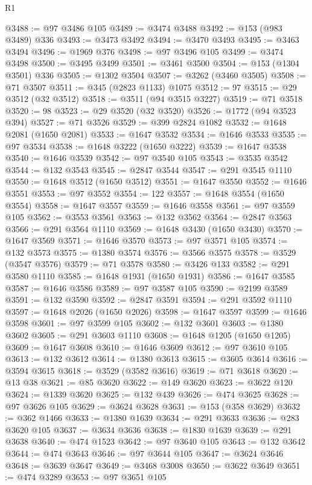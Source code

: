 \begin{lexlean}{R1}
\begin{coremodule}
{{{{{{{{{{{{{{{{{{{{{{{{{{{{{{{{{{{{{{{{{{{{{{{{{{{{{{{{{{{{{{{{{{{{{{{{{{{{{{{{{{{{{{{{{{{{{{{{{{{{{{{{{{{{{{{{{{{{{{{{{{{{{{{{{{{{{{{{{{{{{{{{{{{{{{{{{{{{{{{{{{{{{{{{{{{{{{{{{{{{{{{{{{@3488 := @97 @3486 @105
@3489 := @3474 @3488
@3492 := @153 (@983 @3489) @336
@3493 := @3473 @3492
@3494 := @3470 @3493
@3495 := @3463 @3494
@3496 := @1969 @376
@3498 := @97 @3496 @105
@3499 := @3474 @3498
@3500 := @3495 @3499
@3501 := @3461 @3500
@3504 := @153 (@1304 @3501) @336
@3505 := @1302 @3504
@3507 := @3262 (@3460 @3505)
@3508 := @71 @3507
@3511 := @345 (@2823 @1133) @1075
@3512 := 97
@3515 := @29 @3512 (@32 @3512)
@3518 := @3511 (@94 @3515 @3227)
@3519 := @71 @3518
@3520 := 98
@3523 := @29 @3520 (@32 @3520)
@3526 := @1772 (@94 @3523 @394)
@3527 := @71 @3526
@3529 := @399 @2824 @1082
@3532 := @1648 @2081 (@1650 @2081)
@3533 := @1647 @3532
@3534 := @1646 @3533
@3535 := @97 @3534
@3538 := @1648 @3222 (@1650 @3222)
@3539 := @1647 @3538
@3540 := @1646 @3539
@3542 := @97 @3540 @105
@3543 := @3535 @3542
@3544 := @132 @3543
@3545 := @2847 @3544
@3547 := @291 @3545 @1110
@3550 := @1648 @3512 (@1650 @3512)
@3551 := @1647 @3550
@3552 := @1646 @3551
@3553 := @97 @3552
@3554 := 122
@3557 := @1648 @3554 (@1650 @3554)
@3558 := @1647 @3557
@3559 := @1646 @3558
@3561 := @97 @3559 @105
@3562 := @3553 @3561
@3563 := @132 @3562
@3564 := @2847 @3563
@3566 := @291 @3564 @1110
@3569 := @1648 @3430 (@1650 @3430)
@3570 := @1647 @3569
@3571 := @1646 @3570
@3573 := @97 @3571 @105
@3574 := @132 @3573
@3575 := @1380 @3574
@3576 := @3566 @3575
@3578 := @3529 (@3547 @3576)
@3579 := @71 @3578
@3580 := @3426 @133
@3582 := @291 @3580 @1110
@3585 := @1648 @1931 (@1650 @1931)
@3586 := @1647 @3585
@3587 := @1646 @3586
@3589 := @97 @3587 @105
@3590 := @2199 @3589
@3591 := @132 @3590
@3592 := @2847 @3591
@3594 := @291 @3592 @1110
@3597 := @1648 @2026 (@1650 @2026)
@3598 := @1647 @3597
@3599 := @1646 @3598
@3601 := @97 @3599 @105
@3602 := @132 @3601
@3603 := @1380 @3602
@3605 := @291 @3603 @1110
@3608 := @1648 @1205 (@1650 @1205)
@3609 := @1647 @3608
@3610 := @1646 @3609
@3612 := @97 @3610 @105
@3613 := @132 @3612
@3614 := @1380 @3613
@3615 := @3605 @3614
@3616 := @3594 @3615
@3618 := @3529 (@3582 @3616)
@3619 := @71 @3618
@3620 := @13 @38
@3621 := @85 @3620
@3622 := @149 @3620
@3623 := @3622 @120
@3624 := @1339 @3620
@3625 := @132 @439
@3626 := @474 @3625
@3628 := @97 @3626 @105
@3629 := @3624 @3628
@3631 := @153 (@358 @3629)
@3632 := @362 @1466
@3633 := @1380 @1639
@3634 := @291 @3633
@3636 := @283 @3620 @105
@3637 := @3634 @3636
@3638 := @1830 @1639
@3639 := @291 @3638
@3640 := @474 @1523
@3642 := @97 @3640 @105
@3643 := @132 @3642
@3644 := @474 @3643
@3646 := @97 @3644 @105
@3647 := @3624 @3646
@3648 := @3639 @3647
@3649 := @3468 @3008
@3650 := @3622 @3649
@3651 := @474 @3289
@3653 := @97 @3651 @105
}}}}}}}}}}}}}}}}}}}}}}}}}}}}}}}}}}}}}}}}}}}}}}}}}}}}}}}}}}}}}}}}}}}}}}}}}}}}}}}}}}}}}}}}}}}}}}}}}}}}}}}}}}}}}}}}}}}}}}}}}}}}}}}}}}}}}}}}}}}}}}}}}}}}}}}}}}}}}}}}}}}}}}}}}}}}}}}}}}}}}}}}}}
\end{coremodule}
\end{lexlean}

